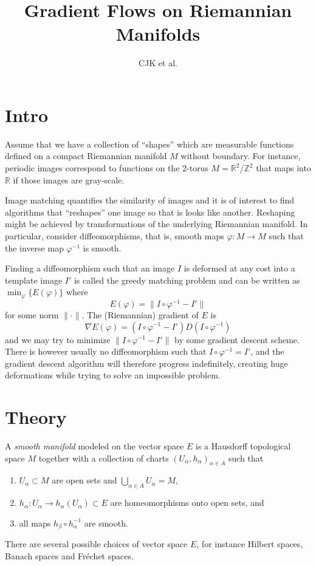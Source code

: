 \documentclass{article}
\title{Gradient Flows on Riemannian Manifolds}
\author{CJK et al.}
\theoremstyle{plain}
\theoremstyle{definition}
\numberwithin{equation}{section}
\newcommand{\Z}{\ensuremath{\mathbb{Z}}}
\newcommand{\R}{\ensuremath{\mathbb{R}}}
\begin{document}
\maketitle 
\thispagestyle{empty}
\tableofcontents

\section{Intro}
Assume that we have a collection of ``shapes'' which are measurable functions defined on a compact Riemannian manifold $M$ without boundary. For instance, periodic images correspond to functions on the 2-torus $M=\R^2/\Z^2$ that maps into $\R$ if those images are gray-scale.

Image matching quantifies the similarity of images and it is of interest to find algorithms that ``reshapes'' one image so that is looks like another. Reshaping might be achieved by transformations of the underlying Riemannian manifold. In particular, consider diffeomorphisms, that is, smooth maps $\varphi:M\to M$ such that the inverse map $\varphi^{-1}$ is smooth.

Finding a diffeomorphism such that an image $I$ is deformed at any cost into a template image $I'$ is called the greedy matching problem and can be written as $\min_\varphi\{E(\varphi)\}$ where
\[
E(\varphi)=\|I\circ\varphi^{-1}-I'\|
\]
for some norm $\|\cdot\|$. The (Riemannian) gradient of $E$ is
\[
\nabla E(\varphi)=(I\circ\varphi^{-1}-I')D(I\circ\varphi^{-1})
\]
and we may try to minimize $\|I\circ\varphi^{-1}-I'\|$ by some gradient descent scheme. There is however usually no diffeomorphism such that $I\circ\varphi^{-1}=I'$, and the gradient descent algorithm will therefore progress indefinitely, creating huge deformations while trying to solve an impossible problem.



\section{Theory}
A \textit{smooth manifold} modeled on the vector space $E$ is a Hausdorff  topological space $M$ together with a collection of charts $(U_\alpha,h_\alpha)_{\alpha\in A}$ such that 
%
\begin{enumerate}
	\item $U_\alpha \subset M$ are open sets and $\bigcup_{\alpha\in A}U_\alpha = M$,
	\item $h_\alpha:U_\alpha\to h_\alpha(U_\alpha)\subset E$ are homeomorphisms onto open sets, and
	\item all maps $h_\beta \circ h^{-1}_\alpha$ are smooth.
\end{enumerate}
%
There are several possible choices of vector space $E$, for instance Hilbert spaces, Banach spaces and Fréchet spaces.
\end{document}
